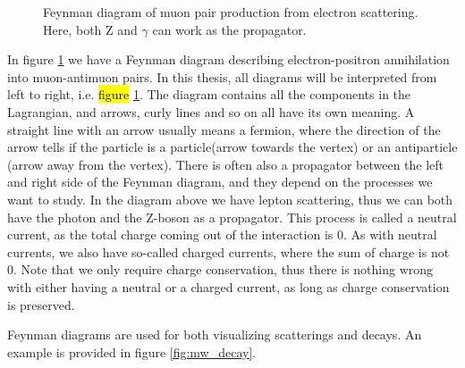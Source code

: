 \begin{figure}[H]
    \centering
    
    \caption[Electron scattering diagram]{Feynman diagram of muon pair production from electron scattering. Here, both Z and $\gamma$ can work as the propagator.}
    \label{fig:eemm_scat}
\end{figure}

In figure \ref{fig:eemm_scat} we have a Feynman diagram describing electron-positron annihilation into muon-antimuon pairs. In this thesis, all 
diagrams will be interpreted from left to right, i.e. \hl{figure} \ref{fig:eemm_scat}.
The diagram contains all the components in the Lagrangian, and arrows, curly lines and so on all have its own meaning. A straight line with 
an arrow usually means a fermion, where the direction of the arrow tells if the particle is a particle(arrow towards the vertex) or an antiparticle (arrow away from the vertex). 
There is often also a propagator between the left and right side of the Feynman diagram, 
and they depend on the processes we want to study. In the diagram above we have lepton scattering, thus we can both have the photon and the 
Z-boson as a propagator. This process is called a neutral current\cite{Pich:819632}, as the total charge coming out of the interaction is 0. 
As with neutral currents, we also have so-called charged currents, where the sum of charge is not 0. Note that we only require charge conservation,
thus there is nothing wrong with either having a neutral or a charged current, as long as charge conservation is preserved. \par 
Feynman diagrams are used for both visualizing scatterings and decays. An example is provided in figure \ref{fig:mw_decay}. 

